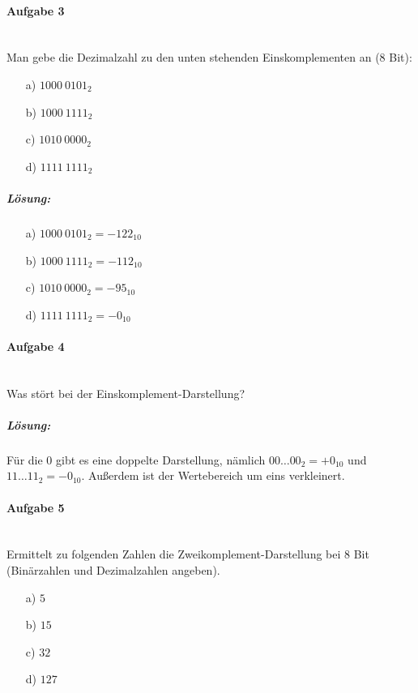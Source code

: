 \documentclass[12pt,a4paper,ngerman]{scrartcl}
\begin{document}
	\paragraph{Aufgabe 3}\mbox{}\\	
	Man gebe die Dezimalzahl zu den unten stehenden Einskomplementen an (8 Bit):
	\begin{itemize}
		\item[a)] $1000\ 0101_2$
		\item[b)] $1000\ 1111_2$
		\item[c)] $1010\ 0000_2$
		\item[d)] $1111\ 1111_2$
	\end{itemize}

	\subparagraph{Lösung:} 
	\begin{itemize}
		\item[a)] $1000\ 0101_2 = -122_{10}$
		\item[b)] $1000\ 1111_2 = -112_{10}$
		\item[c)] $1010\ 0000_2 = -95_{10}$
		\item[d)] $1111\ 1111_2 = -0_{10}$
	\end{itemize}
	
	\paragraph{Aufgabe 4}\mbox{}\\	
	Was stört bei der Einskomplement-Darstellung?
	
	\subparagraph{Lösung:} Für die $0$ gibt es eine doppelte Darstellung, nämlich $00 \dots 00_2 = +0_{10}$ und $11 \dots 11_2 = -0_{10}$. Außerdem ist der Wertebereich um eins verkleinert.
	
	\paragraph{Aufgabe 5}\mbox{}\\
	Ermittelt zu folgenden Zahlen die Zweikomplement-Darstellung bei 8 Bit (Binärzahlen und Dezimalzahlen angeben).
	\begin{itemize}
		\item[a)] $5$
		\item[b)] $15$
		\item[c)] $32$
		\item[d)] $127$
	\end{itemize}
\end{document}

